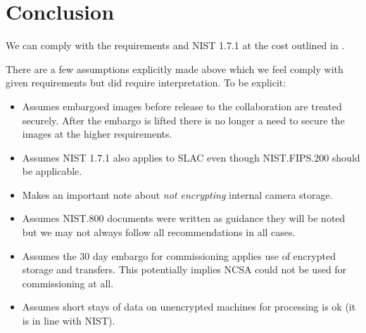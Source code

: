 \section{Conclusion}\label{sec:conc}
We can comply with the requirements and NIST 1.7.1 at the cost outlined in .

There are a few assumptions explicitly made above which we feel comply with given requirements but did require interpretation. To be explicit:
\begin{itemize}
\item {} Assumes embargoed images before release to the collaboration are treated securely. After the embargo is lifted there is no longer a need to secure the images at the higher requirements.
\item {} Assumes NIST 1.7.1 also applies to SLAC even though NIST.FIPS.200 should be applicable.
\item {} Makes an important note about \emph{not encrypting} internal camera storage.
\item {} Assumes NIST.800 documents were written as guidance  they will be noted but we may not always follow all recommendations in all cases.
\item {} Assumes the 30 day embargo for commissioning applies use of encrypted storage and transfers. This potentially implies NCSA could not be used for commissioning at all.
\item {} Assumes short stays of data on unencrypted machines for processing is ok (it is in line with NIST).

\end{itemize}

